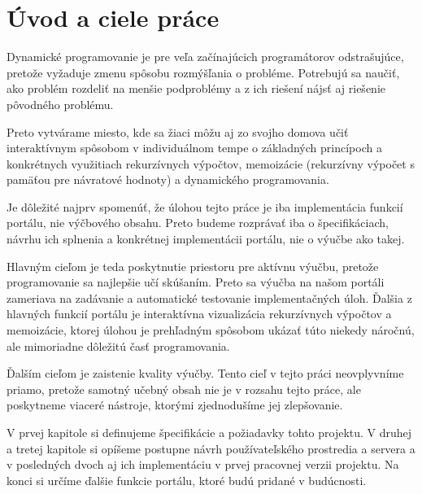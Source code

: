 \chapter*{Úvod a ciele práce}
Dynamické programovanie je pre veľa začínajúcich programátorov odstrašujúce,
pretože vyžaduje zmenu spôsobu rozmýšľania o probléme. Potrebujú sa naučiť,
ako problém rozdeliť na menšie podproblémy a z ich riešení nájsť aj riešenie
pôvodného problému.

Preto vytvárame miesto, kde sa žiaci môžu aj zo svojho domova učiť interaktívnym spôsobom v individuálnom tempe
o základných princípoch a konkrétnych využitiach rekurzívnych výpočtov, memoizácie
(rekurzívny výpočet s pamäťou pre návratové hodnoty) a dynamického programovania.

Je dôležité najprv spomenúť, že úlohou tejto práce je iba implementácia funkcií portálu, nie výčbového
obsahu. Preto budeme rozprávať iba o špecifikáciach, návrhu ich splnenia a konkrétnej implementácii portálu,
nie o výučbe ako takej.

Hlavným cieľom je teda poskytnutie priestoru pre aktívnu výučbu,
pretože programovanie sa najlepšie učí skúšaním. Preto sa výučba na našom portáli zameriava na
zadávanie a automatické testovanie implementačných úloh. Ďalšia z hlavných funkcií portálu je
interaktívna vizualizácia rekurzívnych výpočtov a memoizácie, ktorej úlohou je prehľadným spôsobom ukázať túto niekedy
náročnú, ale mimoriadne dôležitú časť programovania.

Ďalším cieľom je zaistenie kvality výučby. Tento cieľ v tejto práci neovplyvníme
priamo, pretože samotný učebný obsah nie je v rozsahu tejto práce, ale poskytneme
viaceré nástroje, ktorými zjednodušíme jej zlepšovanie.

V prvej kapitole si definujeme špecifikácie a požiadavky tohto projektu.
V druhej a tretej kapitole si opíšeme postupne návrh používateľského prostredia a servera
a v posledných dvoch aj ich implementáciu v prvej pracovnej verzii projektu.
Na konci si určíme ďalšie funkcie portálu, ktoré budú pridané v budúcnosti.
